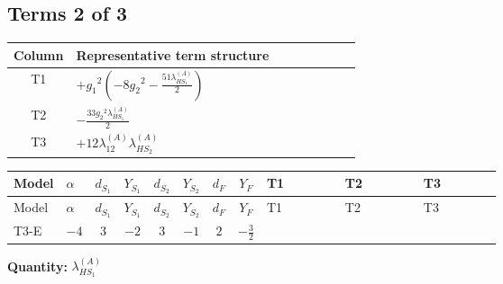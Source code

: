 \documentclass[8pt]{article}
\begin{document}
\begin{landscape}
\subsection*{Terms 2 of 3}
\begin{center}
\begin{tabular}{@{}c >{\raggedright\arraybackslash}p{0.82\linewidth}@{}}
\toprule
Column & Representative term structure \\
\midrule
T1 & \(\displaystyle +{g_1}^2 \left(-8 {g_2}^2-\frac{51 {\lambda_{HS_1}^{(A)}}}{2}\right)\) \\
\midrule
T2 & \(\displaystyle -\frac{33 {g_2}^2 {\lambda_{HS_1}^{(A)}}}{2}\) \\
\midrule
T3 & \(\displaystyle +12 {\lambda_{12}^{(A)}} {\lambda_{HS_2}^{(A)}}\) \\
\midrule
\bottomrule
\end{tabular}
\end{center}
\smallskip
\tiny
\begin{longtable}{@{}llcccccc >{\raggedright\arraybackslash}p{0.21\linewidth} >{\raggedright\arraybackslash}p{0.21\linewidth} >{\raggedright\arraybackslash}p{0.21\linewidth}@{}}
\toprule
Model & $\alpha$ & $d_{S_1}$ & $Y_{S_1}$ & $d_{S_2}$ & $Y_{S_2}$ & $d_F$ & $Y_F$ & T1 & T2 & T3 \\
\midrule
\endfirsthead
\toprule
Model & $\alpha$ & $d_{S_1}$ & $Y_{S_1}$ & $d_{S_2}$ & $Y_{S_2}$ & $d_F$ & $Y_F$ & T1 & T2 & T3 \\
\midrule
\endhead
T3-E & $-4$ & $3$ & $-2$ & $3$ & $-1$ & $2$ & $-\frac{3}{2}$ & \scriptsize\adjustbox{max width=\linewidth}{$\begin{gathered} +{g_1}^2 \left(-8 {g_2}^2-\frac{51 {\lambda_{HS_1}^{(A)}}}{2}\right)\end{gathered}$} & \scriptsize\adjustbox{max width=\linewidth}{$\begin{gathered} -\frac{33 {g_2}^2 {\lambda_{HS_1}^{(A)}}}{2}\end{gathered}$} & \scriptsize\adjustbox{max width=\linewidth}{$\begin{gathered} +12 {\lambda_{12}^{(A)}} {\lambda_{HS_2}^{(A)}}\end{gathered}$} \\
\midrule
\bottomrule
\end{longtable}
\clearpage
\noindent\textbf{Quantity: }$\lambda_{HS_1}^{(A)}$\par\smallskip

\end{landscape}
\end{document}
